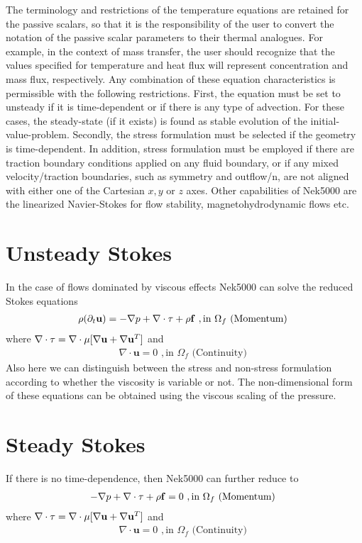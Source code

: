 The terminology and
restrictions of the temperature equations are retained for
the passive scalars, so that it is the responsibility of the
user to convert the notation of the passive scalar
parameters to their thermal analogues.
For example, in the context of mass transfer,
the user should recognize that the values specified
for temperature and heat flux
will represent concentration and mass flux, respectively.
Any combination of these equation characteristics is permissible with the
following restrictions. First, the equation must be set to unsteady if it is
time-dependent or if there is any type of advection. For these cases, the
steady-state (if it exists) is found as stable evolution of the
initial-value-problem. Secondly, the stress formulation must be selected if
the geometry is time-dependent. In addition, stress formulation must be
employed if there are traction boundary conditions applied on any fluid
boundary, or if any mixed velocity/traction boundaries, such as symmetry and
outflow/n, are not aligned with either one of the Cartesian \(x,y\) or \(z\) axes.
Other capabilities of Nek5000 are the linearized Navier-Stokes for flow stability, magnetohydrodynamic flows etc.



\section{Unsteady Stokes }
In the case of flows dominated by viscous effects Nek5000 can solve the reduced Stokes equations
\begin{eqnarray}\label{eq:ns_momentum_stokes}
 \rho(\partial_{t} \mathbf u ) = - \nabla p + \nabla \cdot \tau + \rho {\bf f} \,\, , \text{in } \Omega_f \text{  (Momentum)  }
\end{eqnarray}
where \(\nabla \cdot\tau=\nabla\cdot\mu[\nabla \mathbf{u}+\nabla \mathbf{u}^{T}]\) and
\begin{eqnarray}\label{eq:ns_cont_stokes}
 \nabla \cdot \mathbf u =0 \,\, , \text{in } \Omega_f  \text{  (Continuity)  } 
\end{eqnarray}
Also here we can distinguish between the stress and non-stress formulation according to whether the viscosity is variable or not. The non-dimensional form of these equations can be obtained using the viscous scaling of the pressure.


\section{Steady Stokes }
If there is no time-dependence, then Nek5000 can further reduce to
\begin{eqnarray}\label{eq:ns_momentum_steady_stokes}
 - \nabla p + \nabla \cdot \tau + \rho {\bf f}=0 \,\, , \text{in } \Omega_f \text{  (Momentum)  }
\end{eqnarray}
where \(\nabla \cdot\tau=\nabla\cdot\mu[\nabla \mathbf{u}+\nabla {\mathbf{u} }^{T}]\) and
\begin{eqnarray}\label{eq:ns_cont_steady_stokes}
 \nabla \cdot \mathbf u =0 \,\, , \text{in } \Omega_f  \text{  (Continuity)  } 
\end{eqnarray}

